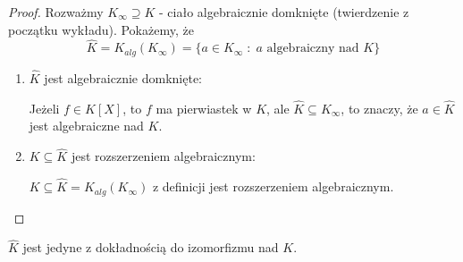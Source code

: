 \begin{proof}
Rozważmy $K_\infty\supseteq K$ - ciało algebraicznie domknięte (twierdzenie z początku wykładu). Pokażemy, że
$$\hat{K}=K_{alg}(K_\infty)=\{a\in K_\infty\;:\;a\text{ algebraiczny nad }K\}$$
\begin{enumerate}
    \item $\hat{K}$ jest algebraicznie domknięte:

    Jeżeli $f\in\hat{K}[X]$, to $f$ ma pierwiastek w $K$, ale $\hat{K}\subseteq K_\infty$, to znaczy, że $a\in\hat{K}$ jest algebraiczne nad $K$.

    \item $K\subseteq\hat{K}$ jest rozszerzeniem algebraicznym:

    $K\subseteq\widehat{K}=K_{alg}(K_\infty)$ z definicji jest rozszerzeniem algebraicznym.
\end{enumerate}
\end{proof}

\begin{tw}\label{tw:4:15}
    $\hat{K}$ jest jedyne z dokładnością do izomorfizmu nad $K$.
\end{tw}

\begin{center}
\end{center}

